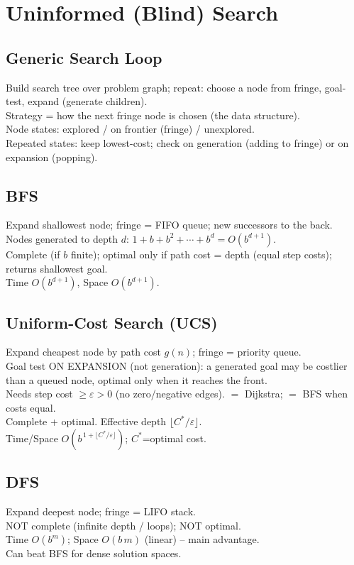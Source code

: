 \section{Uninformed (Blind) Search}

\subsection*{Generic Search Loop}
Build search tree over problem graph; repeat: choose a node from fringe, goal-test, expand (generate children).\\
Strategy = how the next fringe node is chosen (the data structure).\\
Node states: explored / on frontier (fringe) / unexplored.\\
Repeated states: keep lowest-cost; check on generation (adding to fringe) or on expansion (popping).

\subsection*{BFS}
Expand shallowest node; fringe = FIFO queue; new successors to the back.\\
Nodes generated to depth \(d\): \( 1+b+b^2+\cdots+b^d=O(b^{d+1}) \).\\
Complete (if \(b\) finite); optimal only if path cost = depth (equal step costs); returns shallowest goal.\\
Time \( O(b^{d+1}) \), Space \( O(b^{d+1}) \).

\subsection*{Uniform-Cost Search (UCS)}
Expand cheapest node by path cost \( g(n) \); fringe = priority queue.\\
Goal test ON EXPANSION (not generation): a generated goal may be costlier than a queued node, optimal only when it reaches the front.\\
Needs step cost \( \ge \varepsilon>0 \) (no zero/negative edges). \(=\) Dijkstra; \(=\) BFS when costs equal.\\
Complete + optimal. Effective depth \(\lfloor C^*/\varepsilon\rfloor\).\\
Time/Space \(O\!\left(b^{\,1+\lfloor C^*/\varepsilon\rfloor}\right)\); \(C^*\)=optimal cost.

\subsection*{DFS}
Expand deepest node; fringe = LIFO stack.\\
NOT complete (infinite depth / loops); NOT optimal.\\
Time \( O(b^m) \); Space \( O(b\,m) \) (linear) -- main advantage.\\
Can beat BFS for dense solution spaces.

